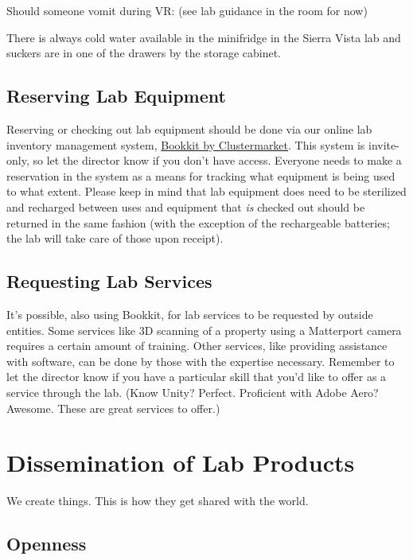 \documentclass[]{tufte-book}
\begin{document}
Should someone vomit during VR: (see lab guidance in the room for now)

There is always cold water available in the minifridge in the Sierra Vista lab and suckers are in one of the drawers by the storage cabinet.

\hypertarget{reserving-lab-equipment}{%
\section{Reserving Lab Equipment}\label{reserving-lab-equipment}}

Reserving or checking out lab equipment should be done via our online lab inventory management system, \href{https://www.clustermarket.com}{Bookkit by Clustermarket}. This system is invite-only, so let the director know if you don't have access. Everyone needs to make a reservation in the system as a means for tracking what equipment is being used to what extent. Please keep in mind that lab equipment does need to be sterilized and recharged between uses and equipment that \emph{is} checked out should be returned in the same fashion (with the exception of the rechargeable batteries; the lab will take care of those upon receipt).

\hypertarget{requesting-lab-services}{%
\section{Requesting Lab Services}\label{requesting-lab-services}}

It's possible, also using Bookkit, for lab services to be requested by outside entities. Some services like 3D scanning of a property using a Matterport camera requires a certain amount of training. Other services, like providing assistance with software, can be done by those with the expertise necessary. Remember to let the director know if you have a particular skill that you'd like to offer as a service through the lab. (Know Unity? Perfect. Proficient with Adobe Aero? Awesome. These are great services to offer.)

\hypertarget{diss}{%
\chapter{Dissemination of Lab Products}\label{diss}}

We create things. This is how they get shared with the world.

\hypertarget{openness}{%
\section{Openness}\label{openness}}
\end{document}
